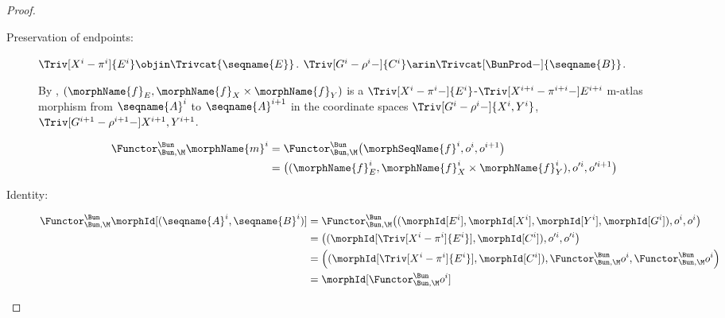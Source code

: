 \documentclass{article}
\begin{document}
\begin{theorem}
\begin{proof}
\begin{description}
\item[Preservation of endpoints:]
$\Triv[X^i-\pi^i]{E^i} \objin \Trivcat{\seqname{E}}$.
$\Triv[G^i-\rho^i-]{C^i} \arin \Trivcat[\BunProd-]{\seqname{B}}$.

By ,
$(\morphName{f}_E, \morphName{f}_X \times \morphName{f}_Y)$ is a
$\Triv[X^i-\pi^i-]{E^i}$-$\Triv[X^{i+i}-\pi^{i+i}-]{E^{i+i}}$ m-atlas
morphism from $\seqname{A}^i$ to $\seqname{A}^{i+1}$ in the coordinate
spaces $\Triv[G^i-\rho^i-]{X^i,Y^i}$,
$\Triv[G^{i+1}-\rho^{i+1}-]{X^{i+1},Y^{i+1}}$.

\begin{align*}
  \Functor^\Bun_{\Bun,\M} \morphName{m}^i
  & =
  \Functor^\Bun_{\Bun,\M}
    \bigl (
      \morphSeqName{f}^i,
      o^i,
      o^{i+1}
    \bigr )
\\*
  & =
  \bigl (
    (
      \morphName{f}^i_E,
      \morphName{f}^i_X \times \morphName{f}^i_Y
    ),
    o'^i,
    o'^{i+1}
  \bigr )
\end{align*}

\item[Identity:]
\begin{align*}
  \Functor^\Bun_{\Bun,\M} \morphId[{{(\seqname{A}^i, \seqname{B}^i)}}]
  & =
  \Functor^\Bun_{\Bun,\M}
    \bigl (
      (\morphId[E^i], \morphId[X^i], \morphId[Y^i], \morphId[G^i]),
      o^i,
      o^i
    \bigr )
\\*
  & =
  \bigl (
    (\morphId[{\Triv[X^i-\pi^i]{E^i}}], \morphId[C^i]),
    o'^i,
    o'^i
  \bigr )
\\*
  & =
  \Bigl (
    (\morphId[{\Triv[X^i-\pi^i]{E^i}}], \morphId[C^i]),
    \Functor^\Bun_{\Bun,\M} o^i,
    \Functor^\Bun_{\Bun,\M} o^i
  \Bigr )
\\*
  & =
  \morphId[{\Functor^\Bun_{\Bun,\M} o^i}]
\end{align*}


\end{description}
\end{proof}
\end{theorem}
\end{document}
